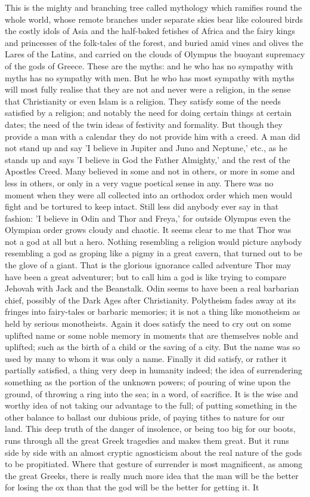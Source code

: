 This is the mighty and branching tree called mythology which ramifies round the whole world, whose remote branches under separate skies bear like coloured birds the costly idols of Asia and the half-baked fetishes of Africa and the fairy kings and princesses of the folk-tales of the forest, and buried amid vines and olives the Lares of the Latins, and carried on the clouds of Olympus the buoyant supremacy of the gods of Greece. These are the myths: and he who has no sympathy with myths has no sympathy with men. But he who has most sympathy with myths will most fully realise that they are not and never were a religion, in the sense that Christianity or even Islam is a religion. They satisfy some of the needs satisfied by a religion; and notably the need for doing certain things at certain dates; the need of the twin ideas of festivity and formality. But though they provide a man with a calendar they do not provide him with a creed. A man did not stand up and say 'I believe in Jupiter and Juno and Neptune,' etc., as he stands up and says 'I believe in God the Father Almighty,' and the rest of the Apostles Creed. Many believed in some and not in others, or more in some and less in others, or only in a very vague poetical sense in any. There was no moment when they were all collected into an orthodox order which men would fight and be tortured to keep intact. Still less did anybody ever say in that fashion: 'I believe in Odin and Thor and Freya,' for outside Olympus even the Olympian order grows cloudy and chaotic. It seems clear to me that Thor was not a god at all but a hero. Nothing resembling a religion would picture anybody resembling a god as groping like a pigmy in a great cavern, that turned out to be the glove of a giant. That is the glorious ignorance called adventure Thor may have been a great adventurer; but to call him a god is like trying to compare Jehovah with Jack and the Beanstalk. Odin seems to have been a real barbarian chief, possibly of the Dark Ages after Christianity. Polytheism fades away at its fringes into fairy-tales or barbaric memories; it is not a thing like monotheism as held by serious monotheists. Again it does satisfy the need to cry out on some uplifted name or some noble memory in moments that are themselves noble and uplifted; such as the birth of a child or the saving of a city. But the name was so used by many to whom it was only a name. Finally it did satisfy, or rather it partially satisfied, a thing very deep in humanity indeed; the idea of surrendering something as the portion of the unknown powers; of pouring of wine upon the ground, of throwing a ring into the sea; in a word, of sacrifice. It is the wise and worthy idea of not taking our advantage to the full; of putting something in the other balance to ballast our dubious pride, of paying tithes to nature for our land. This deep truth of the danger of insolence, or being too big for our boots, runs through all the great Greek tragedies and makes them great. But it runs side by side with an almost cryptic agnosticism about the real nature of the gods to be propitiated. Where that gesture of surrender is most magnificent, as among the great Greeks, there is really much more idea that the man will be the better for losing the ox than that the god will be the better for getting it. It 